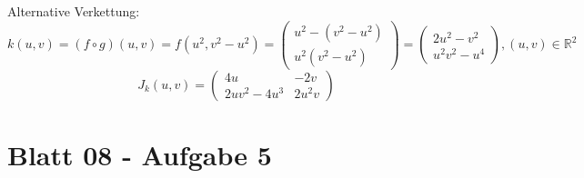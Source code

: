 \documentclass{scrreprt}
\begin{document}
\begin{enumerate}[a)]
  Alternative Verkettung:
  $k(u, v) = (f \circ g) (u, v) = f(u^2, v^2 - u^2) = \begin{pmatrix}
    u^2 - (v^2 - u^2) \\
    u^2(v^2 - u^2)
  \end{pmatrix} = \begin{pmatrix}
    2u^2 -  v^2 \\
    u^2v^2 - u^4
  \end{pmatrix}, (u,v) \in \mathbb{R}^2$
  \[
    J_k (u, v) = \begin{pmatrix}
      4u & -2v \\
      2uv^2-4u^3 & 2u^2v
    \end{pmatrix}
  \]

\end{enumerate}

\section{Blatt 08 - Aufgabe 5}
\end{document}
